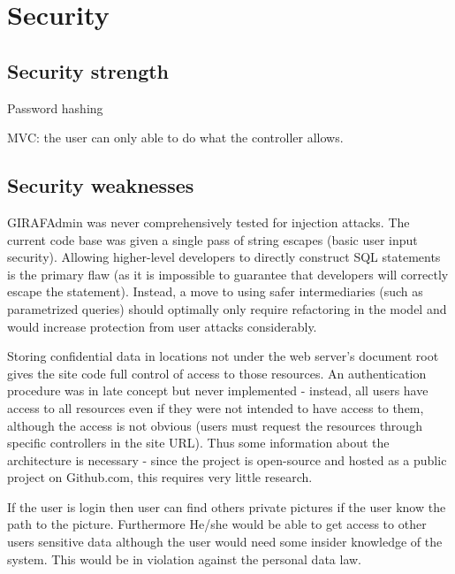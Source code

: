 \section{Security}


\subsection{Security strength }
Password hashing

MVC: the user can only able to do what the controller allows.

\subsection{Security weaknesses}
GIRAFAdmin was never comprehensively tested for injection attacks. The current code base was given a single pass of string escapes (basic user input security). Allowing higher-level developers to directly construct SQL statements is the primary flaw (as it is impossible to guarantee that developers will correctly escape the statement). Instead, a move to using safer intermediaries (such as parametrized queries) should optimally only require refactoring in the model and would increase protection from user attacks considerably. 

Storing confidential data in locations not under the web server's document root gives the site code full control of access to those resources. An authentication procedure was in late concept but never implemented - instead, all users have access to all resources even if they were not intended to have access to them, although the access is not obvious (users must request the resources through specific controllers in the site URL). Thus some information about the architecture is necessary - since the project is open-source and hosted as a public project on Github.com, this requires very little research. 

If the user is login then user can find others private pictures if the user know the path to the picture. Furthermore He/she would be able to get access to other users sensitive data although the user would need some insider knowledge of the system.
This would be in violation against the personal data law.

